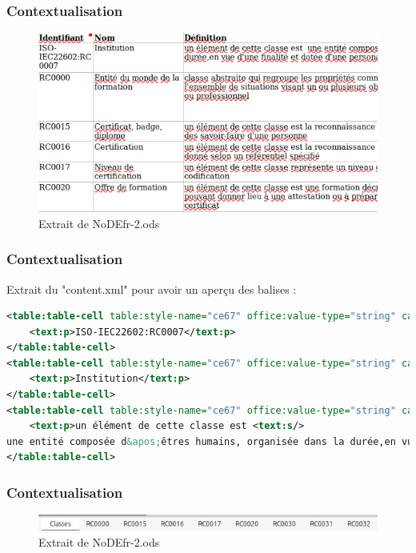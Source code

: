 \documentclass{beamer}
\begin{document}
\begin{frame}
\frametitle{Contextualisation}

\begin{figure}
\includegraphics[scale=0.5]{extraitClasses.png}
\caption{Extrait de NoDEfr-2.ods}
\end{figure}
\end{frame}

\begin{frame}[fragile]
\frametitle{Contextualisation}

Extrait du "content.xml" pour avoir un aperçu des balises :

\vspace{0.5cm}
\begin{lstlisting}[language=XML]
<table:table-cell table:style-name="ce67" office:value-type="string" calcext:value-type="string">
    <text:p>ISO-IEC22602:RC0007</text:p>
</table:table-cell>
<table:table-cell table:style-name="ce67" office:value-type="string" calcext:value-type="string">
    <text:p>Institution</text:p>
</table:table-cell>
<table:table-cell table:style-name="ce67" office:value-type="string" calcext:value-type="string">
    <text:p>un élément de cette classe est <text:s/>
une entité composée d&apos;êtres humains, organisée dans la durée,en vue d&apos;une finalité et dotée d&apos;une personalité juridique</text:p>
</table:table-cell>
\end{lstlisting}
\end{frame}


\begin{frame}
\frametitle{Contextualisation}

\begin{figure}
\includegraphics[scale=0.5]{listeClasses.png}
\caption{Extrait de NoDEfr-2.ods}
\end{figure}
\end{frame}
\end{document}
